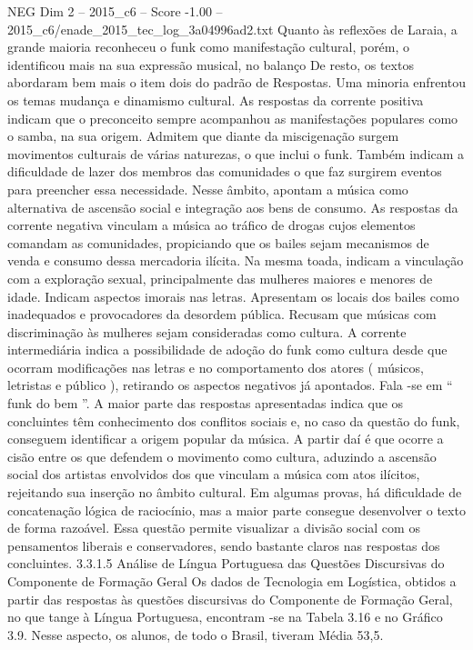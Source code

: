 \begin{textsample}{NEG Dim 2 – 2015\_c6 – Score -1.00 – 2015\_c6/enade\_2015\_tec\_log\_3a04996ad2.txt}
Quanto às reflexões de Laraia, a grande maioria reconheceu o funk como manifestação cultural, porém, o identificou mais na sua expressão musical, no balanço De resto, os textos abordaram bem mais o item dois do padrão de Respostas.
Uma minoria enfrentou os temas mudança e dinamismo cultural.
As respostas da corrente positiva indicam que o preconceito sempre acompanhou as manifestações populares como o samba, na sua origem.
Admitem que diante da miscigenação surgem movimentos culturais de várias naturezas, o que inclui o funk.
Também indicam a dificuldade de lazer dos membros das comunidades o que faz surgirem eventos para preencher essa necessidade.
Nesse âmbito, apontam a música como alternativa de ascensão social e integração aos bens de consumo.
As respostas da corrente negativa vinculam a música ao tráfico de drogas cujos elementos comandam as comunidades, propiciando que os bailes sejam mecanismos de venda e consumo dessa mercadoria ilícita.
Na mesma toada, indicam a vinculação com a exploração sexual, principalmente das mulheres maiores e menores de idade.
Indicam aspectos imorais nas letras.
Apresentam os locais dos bailes como inadequados e provocadores da desordem pública.
Recusam que músicas com discriminação às mulheres sejam consideradas como cultura.
A corrente intermediária indica a possibilidade de adoção do funk como cultura desde que ocorram modificações nas letras e no comportamento dos atores ( músicos, letristas e público ), retirando os aspectos negativos já apontados.
Fala -se em “ funk do bem ”.
A maior parte das respostas apresentadas indica que os concluintes têm conhecimento dos conflitos sociais e, no caso da questão do funk, conseguem identificar a origem popular da música.
A partir daí é que ocorre a cisão entre os que defendem o movimento como cultura, aduzindo a ascensão social dos artistas envolvidos dos que vinculam a música com atos ilícitos, rejeitando sua inserção no âmbito cultural.
Em algumas provas, há dificuldade de concatenação lógica de raciocínio, mas a maior parte consegue desenvolver o texto de forma razoável.
Essa questão permite visualizar a divisão social com os pensamentos liberais e conservadores, sendo bastante claros nas respostas dos concluintes. 3.3.1.5 Análise de Língua Portuguesa das Questões Discursivas do Componente de Formação Geral Os dados de Tecnologia em Logística, obtidos a partir das respostas às questões discursivas do Componente de Formação Geral, no que tange à Língua Portuguesa, encontram -se na Tabela 3.16 e no Gráfico 3.9.
Nesse aspecto, os alunos, de todo o Brasil, tiveram Média 53,5.

\end{textsample}
